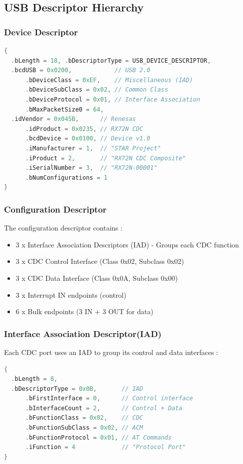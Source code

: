 \subsection{USB Descriptor Hierarchy}

\subsubsection{Device Descriptor}

\begin{lstlisting}[language = C, caption = {USB Device Descriptor},
                   label = {lst : usb_device_desc}]
{
  .bLength = 18, .bDescriptorType = USB_DEVICE_DESCRIPTOR,
  .bcdUSB = 0x0200,            // USB 2.0
      .bDeviceClass = 0xEF,    // Miscellaneous (IAD)
      .bDeviceSubClass = 0x02, // Common Class
      .bDeviceProtocol = 0x01, // Interface Association
      .bMaxPacketSize0 = 64,
  .idVendor = 0x045B,      // Renesas
      .idProduct = 0x0235, // RX72N CDC
      .bcdDevice = 0x0100, // Device v1.0
      .iManufacturer = 1,  // "STAR Project"
      .iProduct = 2,       // "RX72N CDC Composite"
      .iSerialNumber = 3,  // "RX72N-00001"
      .bNumConfigurations = 1
}
\end{lstlisting}

\subsubsection{Configuration Descriptor}

The configuration descriptor contains :
\begin{itemize}
\item 3 x Interface Association Descriptors (IAD) - Groups each CDC function
\item 3 x CDC Control Interface (Class 0x02, Subclass 0x02)
\item 3 x CDC Data Interface (Class 0x0A, Subclass 0x00)
\item 3 x Interrupt IN endpoints (control)
\item 6 x Bulk endpoints (3 IN + 3 OUT for data)
\end{itemize}

\subsubsection{Interface Association Descriptor(IAD)}

Each CDC port uses an IAD to group its control and data interfaces :

\begin{lstlisting}[language = C, caption = { IAD for Port 0(Protocol Port)},
                    label = {lst : usb_iad}]
{
  .bLength = 8,
  .bDescriptorType = 0x0B,       // IAD
      .bFirstInterface = 0,      // Control interface
      .bInterfaceCount = 2,      // Control + Data
      .bFunctionClass = 0x02,    // CDC
      .bFunctionSubClass = 0x02, // ACM
      .bFunctionProtocol = 0x01, // AT Commands
      .iFunction = 4             // "Protocol Port"
}
\end{lstlisting}

